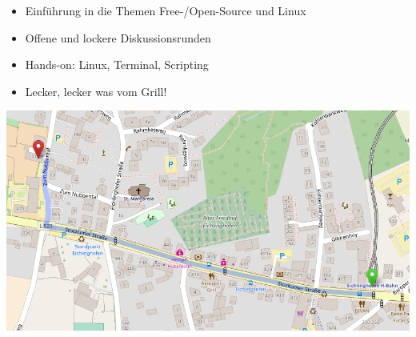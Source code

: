 \documentclass{beamer}
\begin{document}
\begin{frame}
		{ \scriptsize
			\begin{minipage}{0.56\linewidth}
				\begin{itemize}
					\item Einführung in die Themen Free-/Open-Source und Linux
					\item Offene und lockere Diskussionsrunden
					\item Hands-on: Linux, Terminal, Scripting
					\item Lecker, lecker was vom Grill!
				\end{itemize}
			\end{minipage}
		}	
		\begin{minipage}{0.35\linewidth}
			\includegraphics[scale=0.23]{resources/map}
		\end{minipage}
	\end{frame}
\end{document}
